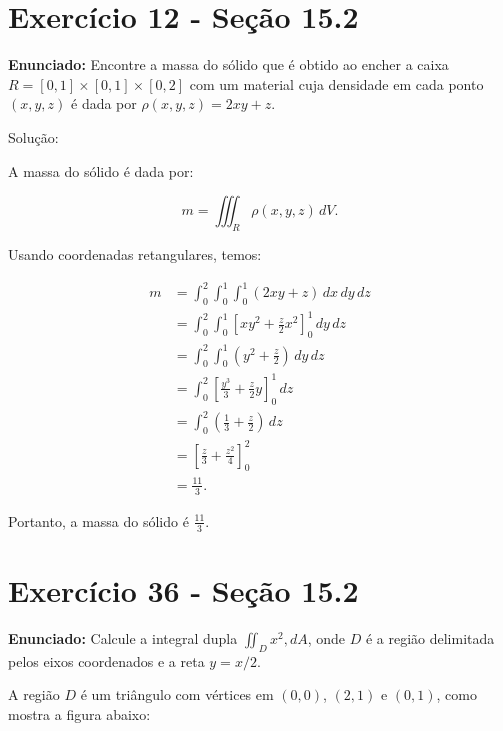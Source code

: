 \documentclass{article}
\begin{document}
\section*{Exercício 12 - Seção 15.2}

\textbf{Enunciado:} Encontre a massa do sólido que é obtido ao encher a caixa $R=[0,1] \times [0,1] \times [0,2]$ com um material cuja densidade em cada ponto $(x,y,z)$ é dada por $\rho(x,y,z)=2xy+z$.

Solução:

A massa do sólido é dada por:

$$
m = \iiint_R \rho(x,y,z) \, dV.
$$

Usando coordenadas retangulares, temos:

\begin{align*}
m &= \int_{0}^{2} \int_{0}^{1} \int_{0}^{1} (2xy+z) \, dx \, dy \, dz \\
&= \int_{0}^{2} \int_{0}^{1} \left[ xy^2 + \frac{z}{2}x^2 \right]_{0}^{1} \, dy \, dz \\
&= \int_{0}^{2} \int_{0}^{1} \left( y^2 + \frac{z}{2} \right) \, dy \, dz \\
&= \int_{0}^{2} \left[ \frac{y^3}{3} + \frac{z}{2}y \right]_{0}^{1} \, dz \\
&= \int_{0}^{2} \left( \frac{1}{3} + \frac{z}{2} \right) \, dz \\
&= \left[ \frac{z}{3} + \frac{z^2}{4} \right]_{0}^{2} \\
&= \frac{11}{3}.
\end{align*}

Portanto, a massa do sólido é $\frac{11}{3}$.
\newpage

\section*{Exercício 36 - Seção 15.2}
\textbf{Enunciado:} Calcule a integral dupla $\iint_D x^2 , dA$, onde $D$ é a região delimitada pelos eixos coordenados e a reta $y=x/2$.

A região $D$ é um triângulo com vértices em $(0,0)$, $(2,1)$ e $(0,1)$, como mostra a figura abaixo:

\end{document}
